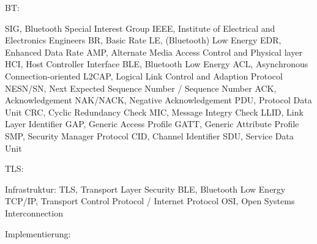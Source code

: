 BT:

SIG, Bluetooth Special Interest Group
IEEE, Institute of Electrical and Electronics Engineers
BR, Basic Rate
LE, (Bluetooth) Low Energy
EDR, Enhanced Data Rate
AMP, Alternate Media Access Control and Physical layer 
HCI, Host Controller Interface
BLE, Bluetooth Low Energy
ACL, Asynchronous Connection-oriented
L2CAP, Logical Link Control and Adaption Protocol
NESN/SN, Next Expected Sequence Number / Sequence Number
ACK, Acknowledgement
NAK/NACK, Negative Acknowledgement
PDU, Protocol Data Unit
CRC, Cyclic Redundancy Check
MIC, Message Integry Check
LLID, Link Layer Identifier
GAP, Generic Access Profile
GATT, Generic Attribute Profile
SMP, Security Manager Protocol
CID, Channel Identifier
SDU, Service Data Unit

TLS:

Infrastruktur:
TLS, Transport Layer Security
BLE, Bluetooth Low Energy
TCP/IP, Transport Control Protocol / Internet Protocol
OSI, Open Systems Interconnection

Implementierung: